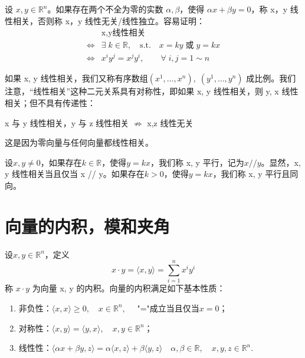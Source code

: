 \documentclass{article}
\begin{document}
\vspace{10pt}

设 \(x,y \in \mathbb{R}^n\)。如果存在两个不全为零的实数 \(\alpha , \beta\)，使得 \(\alpha x +\beta y = 0\)，称 x，y 线性相关，否则称 x，y 线性无关/线性独立。容易证明：
\begin{align*}
    & \text{x,y线性相关} \\
    \iff & \exists \;k \in \mathbb{R},\quad \text{s.t.} \quad x = ky\; \text{或}\; y = kx \\
    \iff & x^i y^j = x^j y^i,\qquad \forall \; i, j = 1 \sim n
\end{align*}

如果 x, y 线性相关，我们又称有序数组\((x^1,\dots ,x^n),\;(y^1,\dots ,y^n)\) 成比例。我们注意，“线性相关”这种二元关系具有对称性，即如果 x, y 线性相关，则 y, x 线性相关；但不具有传递性：
\begin{center}
    x 与 y 线性相关，y 与 z 线性相关 \(\nRightarrow\) x,z 线性无关
\end{center}
这是因为零向量与任何向量都线性相关。

\vspace{20pt}

设\(x, y \neq 0\)，如果存在\(k \in \mathbb{R}\)，使得\(y = kx\)，我们称 x, y 平行，记为\(x // y\)。显然，x, y 线性相关当且仅当 x // y。如果存在\(k > 0\)，使得\(y = kx\)，我们称 x, y 平行且同向。

\newpage

\section{向量的内积，模和夹角}
设\(x, y \in \mathbb{R}^n\)，定义
\begin{equation*}
    x \cdot y = \langle x , y \rangle =\sum_{i = 1}^n x^i y^i
\end{equation*}
称 \(x \cdot y\) 为向量 x, y 的内积。向量的内积满足如下基本性质：
\begin{enumerate}
    \item 非负性：\( \langle x, x \rangle \ge 0,\quad x \in \mathbb{R}^n, \quad \) "="成立当且仅当\(x = 0\)；
    \item 对称性：\( \langle x, y \rangle = \langle y, x \rangle ,\quad x, y \in \mathbb{R}^n\)；
    \item 线性性：\( \langle\alpha x + \beta y, z \rangle = \alpha \langle x, z \rangle + \beta \langle y, z \rangle \quad \alpha ,\beta \in \mathbb{R},\quad x,y,z \in \mathbb{R}^n\).
\end{enumerate}
\end{document}
